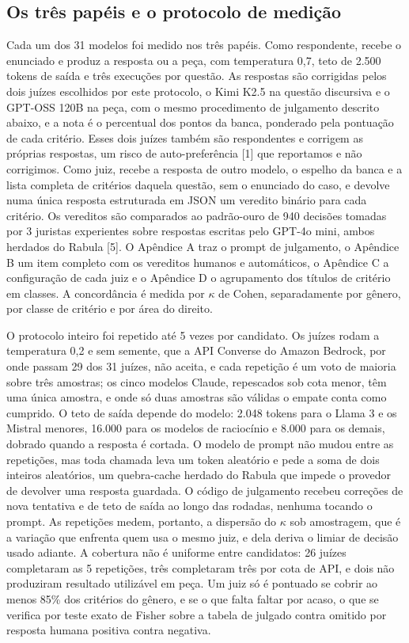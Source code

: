\documentclass{IOS-Book-Article}
\begin{document}
\subsection{Os três papéis e o protocolo de medição}

Cada um dos 31 modelos foi medido nos três papéis. Como respondente, recebe o enunciado e produz a resposta ou a peça, com temperatura 0,7, teto de 2.500 tokens de saída e três execuções por questão. As respostas são corrigidas pelos dois juízes escolhidos por este protocolo, o Kimi K2.5 na questão discursiva e o GPT-OSS 120B na peça, com o mesmo procedimento de julgamento descrito abaixo, e a nota é o percentual dos pontos da banca, ponderado pela pontuação de cada critério. Esses dois juízes também são respondentes e corrigem as próprias respostas, um risco de auto-preferência [1] que reportamos e não corrigimos. Como juiz, recebe a resposta de outro modelo, o espelho da banca e a lista completa de critérios daquela questão, sem o enunciado do caso, e devolve numa única resposta estruturada em JSON um veredito binário para cada critério. Os vereditos são comparados ao padrão-ouro de 940 decisões tomadas por 3 juristas experientes sobre respostas escritas pelo GPT-4o mini, ambos herdados do Rabula [5]. O Apêndice A traz o prompt de julgamento, o Apêndice B um item completo com os vereditos humanos e automáticos, o Apêndice C a configuração de cada juiz e o Apêndice D o agrupamento dos títulos de critério em classes. A concordância é medida por $\kappa$ de Cohen, separadamente por gênero, por classe de critério e por área do direito.

O protocolo inteiro foi repetido até 5 vezes por candidato. Os juízes rodam a temperatura 0,2 e sem semente, que a API Converse do Amazon Bedrock, por onde passam 29 dos 31 juízes, não aceita, e cada repetição é um voto de maioria sobre três amostras; os cinco modelos Claude, repescados sob cota menor, têm uma única amostra, e onde só duas amostras são válidas o empate conta como cumprido. O teto de saída depende do modelo: 2.048 tokens para o Llama 3 e os Mistral menores, 16.000 para os modelos de raciocínio e 8.000 para os demais, dobrado quando a resposta é cortada. O modelo de prompt não mudou entre as repetições, mas toda chamada leva um token aleatório e pede a soma de dois inteiros aleatórios, um quebra-cache herdado do Rabula que impede o provedor de devolver uma resposta guardada. O código de julgamento recebeu correções de nova tentativa e de teto de saída ao longo das rodadas, nenhuma tocando o prompt. As repetições medem, portanto, a dispersão do $\kappa$ sob amostragem, que é a variação que enfrenta quem usa o mesmo juiz, e dela deriva o limiar de decisão usado adiante. A cobertura não é uniforme entre candidatos: 26 juízes completaram as 5 repetições, três completaram três por cota de API, e dois não produziram resultado utilizável em peça. Um juiz só é pontuado se cobrir ao menos 85\% dos critérios do gênero, e se o que falta faltar por acaso, o que se verifica por teste exato de Fisher sobre a tabela de julgado contra omitido por resposta humana positiva contra negativa.
\end{document}
